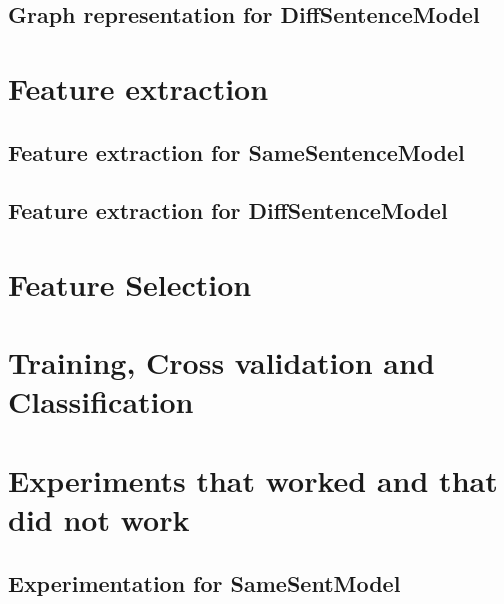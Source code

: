 \subsection{Graph representation for DiffSentenceModel}

\section{Feature extraction}\label{sec:featExp}

\subsection{Feature extraction for SameSentenceModel}

\subsection{Feature extraction for DiffSentenceModel}

\section{Feature Selection}\label{sec:featSel}

%
%
%

\section{Training, Cross validation and Classification}\label{sec:training}

\section{Experiments that worked and that did not work}\label{sec:experiments}

\subsection{Experimentation for SameSentModel}

